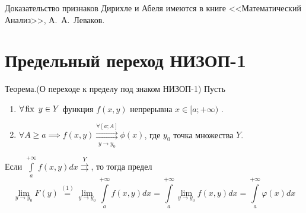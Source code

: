 \documentclass[../../main.tex]{subfiles}
\begin{document}
Доказательство признаков Дирихле и Абеля имеются в книге <<Математический Анализ>>, А.~А.~Леваков.


\section{ Предельный переход НИЗОП-1}
\begin{thm}Теорема.(О переходе к пределу под знаком НИЗОП-1)
Пусть

\begin{enumerate}
\item $\forall \operatorname{fix} \ y \in Y$ функция $f(x,y)$ непрерывна $x \in [a;+\infty)$ .
\item $\forall A \ge a \implies f(x,y) \overset{\forall [a;A]}{\underset{y \to 
y_0}{\rightrightarrows}} \phi(x) $, где $y_0$ точка множества $Y$.
\end{enumerate}

Если $\int\limits_a^{+\infty}f(x,y)dx \overset{Y}\rightrightarrows $, то тогда 
предел \begin{equation}\label{lec10:12}
\underset{y \to y_0}\lim F(y) \overset{(1)}= \underset{y \to 
y_0}\lim\int\limits_a^{+\infty}f(x,y)dx =\int\limits_a^{+\infty} \underset{y 
\to y_0}\lim f(x,y)dx = \int\limits_a^{+\infty}\varphi(x)dx \end{equation}
\end{thm}
\end{document}
